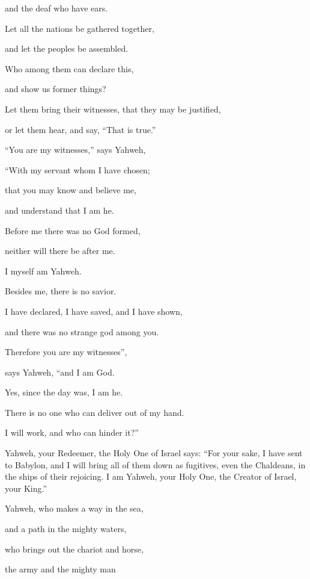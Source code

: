 {\par }{\QB and the deaf who have ears.
\par }{\Q {}Let all the nations be gathered together,
\par }{\QB and let the peoples be assembled.
\par }{\Q Who among them can declare this,
\par }{\QB and show us former things?
\par }{\Q Let them bring their witnesses, that they may be justified,
\par }{\QB or let them hear, and say, “That is true.”
\par }{\BB \par }{\Q {}“You are my witnesses,” says Yahweh,
\par }{\QB “With my servant whom I have chosen;
\par }{\QB that you may know and believe me,
\par }{\QB and understand that I am he.
\par }{\Q Before me there was no God formed,
\par }{\QB neither will there be after me.
\par }{\Q {}I myself am Yahweh.
\par }{\QB Besides me, there is no savior.
\par }{\Q {}I have declared, I have saved, and I have shown,
\par }{\QB and there was no strange god among you.
\par }{\Q Therefore you are my witnesses”,
\par }{\QB says Yahweh, “and I am God.
\par }{\Q {}Yes, since the day was, I am he.
\par }{\QB There is no one who can deliver out of my hand.
\par }{\QB I will work, and who can hinder it?”
\par }{\PP {}Yahweh, your Redeemer, the Holy One of Israel says: “For your sake, I have sent to Babylon, and I will bring all of them down as fugitives, even the Chaldeans, in the ships of their rejoicing.
I am Yahweh, your Holy One, the Creator of Israel, your King.”
\par }{\PP {}Yahweh, who makes a way in the sea,
\par }{\QB and a path in the mighty waters,
\par }{\Q {}who brings out the chariot and horse,
\par }{\QB the army and the mighty man
}
